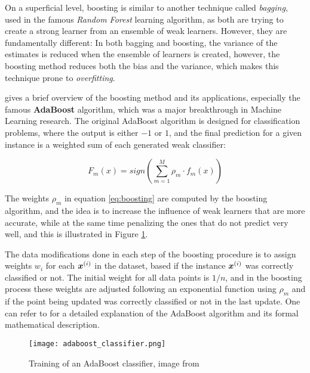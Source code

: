 On a superficial level, boosting is similar to another technique called \textit{bagging}, used in the famous \textit{Random Forest} learning algorithm, as both are trying to create a strong learner from an ensemble of weak learners. However, they are fundamentally different: In both bagging and boosting, the variance of the estimates is reduced when the ensemble of learners is created, however, the boosting method reduces both the bias and the variance, which makes this technique prone to \textit{overfitting}.

\cite{Schapire:1999:BIB:1624312.1624417} gives a brief overview of the boosting method and its applications, especially the famous \textbf{AdaBoost} algorithm, which was a major breakthrough in Machine Learning research. The original AdaBoost algorithm is designed for classification problems, where the output is either $-1$ or $1$, and the final prediction for a given instance is a weighted sum of each generated weak classifier:

\begin{equation}\label{eq:boosting}
    F_m(x) = sign(\sum_{m=1}^{M}\rho_m\cdot f_m(x))
\end{equation}

The weights $\rho_m$ in equation \ref{eq:boosting} are computed by the boosting algorithm, and the idea is to increase the influence of weak learners that are more accurate, while at the same time penalizing the ones that do not predict very well, and this is illustrated in Figure \ref{fig:humanbeta}.

The data modifications done in each step of the boosting procedure is to assign weights $w_i$ for each $\bm{x}^{(i)}$ in the dataset, based if the instance $\bm{x}^{(i)}$ was correctly classified or not. The initial weight for all data points is $1/n$, and in the boosting process these weights are adjusted following an exponential function using $\rho_m$ and if the point being updated was correctly classified or not in the last update. One can refer to \cite{hastie2009elements} for a detailed explanation of the AdaBoost algorithm and its formal mathematical description. 

\begin{figure}[!h]
  \centering
  \texttt{[image: adaboost\_classifier.png]} 
  \caption{Training of an AdaBoost classifier, image from \cite{adaboost:brendan}}
  \label{fig:humanbeta} 
\end{figure}

